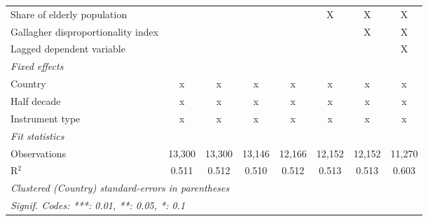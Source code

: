 \begin{tabular}{lccccccc}
   Share of elderly population                                   &                &                &               &               & X             & X             & X\\  
   Gallagher disproportionality index                            &                &                &               &               &               & X             & X\\  
   Lagged dependent variable                                     &                &                &               &               &               &               & X\\  
   \emph{Fixed effects}\\
   Country                                                       & x              & x              & x             & x             & x             & x             & x\\  
   Half decade                                                   & x              & x              & x             & x             & x             & x             & x\\  
   Instrument type                                               & x              & x              & x             & x             & x             & x             & x\\  
   \midrule \emph{Fit statistics}\\
   Observations                                                  & 13,300         & 13,300         & 13,146        & 12,166        & 12,152        & 12,152        & 11,270\\  
   R$^2$                                                         & 0.511          & 0.512          & 0.510         & 0.512         & 0.513         & 0.513         & 0.603\\  
   \midrule
   \multicolumn{8}{l}{\emph{Clustered (Country) standard-errors in parentheses}}\\
   \multicolumn{8}{l}{\emph{Signif. Codes: ***: 0.01, **: 0.05, *: 0.1}}\\
\end{tabular}
\par\endgroup


